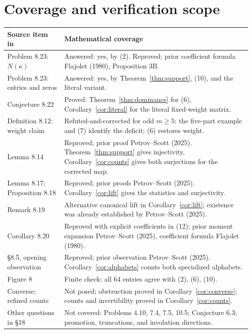 \documentclass[11pt]{article}
\begin{document}
\section{Coverage and verification scope}
\begin{center}\small
\begin{tabular}{@{}p{}p{}@{}}
\toprule
Source item in~\cite{PS} & Mathematical coverage\\
\midrule
Problem 8.23: $N(\kappa)$ & Answered: yes, by (2).
Reproved; prior coefficient formula Flajolet (1980), Proposition 3B.\\
Problem 8.23: entries and zeros & Answered: yes, by
Theorem~\ref{thm:support}, (10), and the literal variant.\\
Conjecture 8.22 & Proved: Theorem~\ref{thm:dominance} for (6),
Corollary~\ref{cor:literal} for the literal fixed-weight matrix.\\
Definition 8.12: weight claim & Refuted-and-corrected for odd $m\ge5$:
the five-part example and (7) identify the deficit; (6) restores weight.\\
Lemma 8.14 & Reproved; prior proof Petrov--Scott (2025).
Theorem~\ref{thm:support} gives injectivity, Corollary~\ref{cor:counts}
gives both surjections for the corrected map.\\
Lemma 8.17; Proposition 8.18 & Reproved; prior proofs Petrov--Scott
(2025). Corollary~\ref{cor:lift} gives the statistics and surjectivity.\\
Remark 8.19 & Alternative canonical lift in Corollary~\ref{cor:lift};
existence was already established by Petrov--Scott (2025).\\
Corollary 8.20 & Reproved with explicit coefficients in (12);
prior moment expansion Petrov--Scott (2025), coefficient formula
Flajolet (1980).\\
\S8.5, opening observation & Reproved; prior observation Petrov--Scott
(2025). Corollary~\ref{cor:alphabets} counts both specialized alphabets.\\
Figure 8 & Finite check: all 64 entries agree with (2), (6), (10).\\
Converse; refined counts & Not posed; obstruction proved in
Corollary~\ref{cor:converse}; counts and invertibility proved in
Corollary~\ref{cor:counts}.\\
Other questions in \S18 & Not covered: Problems 4.10, 7.4, 7.5, 10.5;
Conjecture 6.3; promotion, truncations, and involution directions.\\
\bottomrule
\end{tabular}
\end{center}
\end{document}

